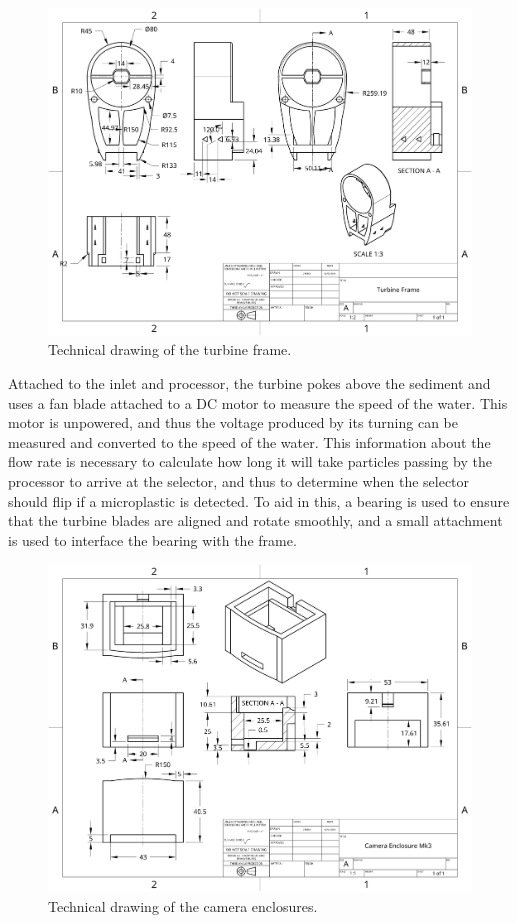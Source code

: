 \documentclass[fleqn,10pt]{SelfArx} %
\begin{document}
	\begin{figure}[h]
		\centering
		\includegraphics[width=1\linewidth]{Figures/TechTurbine}
		\caption[Turbine Tech. Drawing]{Technical drawing of the turbine frame.}
		\label{fig:techturbine}
	\end{figure}
	Attached to the inlet and processor, the turbine pokes above the sediment and uses a fan blade attached to a DC motor to measure the speed of the water. This motor is unpowered, and thus the voltage produced by its turning can be measured and converted to the speed of the water. This information about the flow rate is necessary to calculate how long it will take particles passing by the processor to arrive at the selector, and thus to determine when the selector should flip if a microplastic is detected. To aid in this, a bearing is used to ensure that the turbine blades are aligned and rotate smoothly, and a small attachment is used to interface the bearing with the frame. 
	\begin{figure}[h]
		\centering
		\includegraphics[width=1\linewidth]{Figures/TechCamBox}
		\caption[Camera Box Tech. Drawing]{Technical drawing of the camera enclosures.}
		\label{fig:techCamBox}
	\end{figure}
\end{document}
